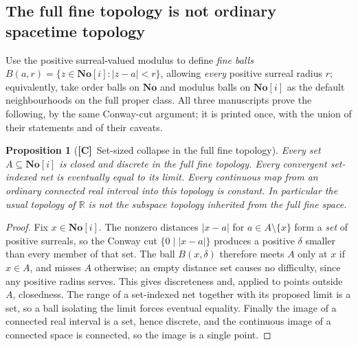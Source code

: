 \documentclass[11pt,letterpaper]{article}
\numberwithin{equation}{section}
\newtheorem{proposition}[theorem]{Proposition}
\theoremstyle{definition}
\theoremstyle{remark}
\newcommand{\No}{\mathbf{No}}
\newcommand{\SC}{\mathbf{No}[i]}
\newcommand{\R}{\mathbb R}
\newcommand{\abs}[1]{\lvert#1\rvert}
\newcommand{\TC}{\textcolor{TierC}{\textsf{\bfseries[C]}}}
\begin{document}
\subsection{The full fine topology is not ordinary spacetime topology}
\label{phys:sub:fine}

Use the positive surreal-valued modulus to define \emph{fine balls}
$B(a,r)=\{z\in\SC:\abs{z-a}<r\}$, allowing \emph{every} positive surreal
radius $r$; equivalently, take order balls on $\No$ and modulus balls on $\SC$
as the default neighbourhoods on the full proper class. All three manuscripts
prove the following, by the same Conway-cut argument; it is printed once, with
the union of their statements and of their caveats.

\begin{proposition}[\TC\ Set-sized collapse in the full fine topology]
\label{phys:prop:discrete}
Every \emph{set} $A\subseteq\SC$ is closed and discrete in the full fine
topology. Every convergent set-indexed net is eventually equal to its limit.
Every continuous map from an ordinary connected real interval into this
topology is constant. In particular the usual topology of $\R$ is \emph{not}
the subspace topology inherited from the full fine space.
\end{proposition}
\begin{proof}
Fix $x\in\SC$. The nonzero distances $\abs{x-a}$ for $a\in A\setminus\{x\}$
form a \emph{set} of positive surreals, so the Conway cut
$\{0\mid \abs{x-a}\}$ produces a positive $\delta$ smaller than every member of
that set. The ball $B(x,\delta)$ therefore meets $A$ only at $x$ if $x\in A$,
and misses $A$ otherwise; an empty distance set causes no difficulty, since any
positive radius serves. This gives discreteness and, applied to points outside
$A$, closedness. The range of a set-indexed net together with its proposed
limit is a set, so a ball isolating the limit forces eventual equality.
Finally the image of a connected real interval is a set, hence discrete, and
the continuous image of a connected space is connected, so the image is a
single point.
\end{proof}
\end{document}

